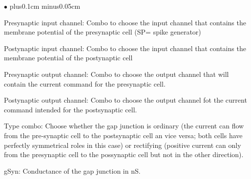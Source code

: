 \documentclass{article}
\newenvironment{myitem}{\begin{list}{$\bullet$}{\setlength{\leftmargin}{1.1em}
\itemsep0.1cm plus0.1cm minus0.05cm
\listparindent0cm
\addtolength{\labelsep}{0.5\labelsep}
\setlength{\labelwidth}{0.8em}
\setlength{\leftmargin}{\labelwidth}
\addtolength{\leftmargin}{\labelsep}
}}{\end{list}}
\begin{document}
\begin{myitem}
\item Presynaptic input channel: Combo to choose the input channel
  that contains the membrane potential of the presynaptic cell (SP= spike
  generator) 
\item Postynaptic input channel: Combo to choose the input channel
  that contains the membrane potential of the postynaptic cell 
\item Presynaptic output channel: Combo to choose the output channel
  that will contain the current command for the presynaptic cell. 
\item Postynaptic output channel: Combo to choose the output channel
  fot the current command intended for the postsynaptic cell.
\item Type combo: Choose whether the gap junction is ordinary (the
  current can flow from the pre-synaptic cell to the postsynaptic cell
  an vice versa; both cells have perfectly symmetrical roles in this
  case) or rectifying (positive current can only from the presynaptic
  cell to the possynaptic cell but not in the other direction). 
\item gSyn: Conductance of the gap junction in nS.  
\end{myitem}
\end{document}
